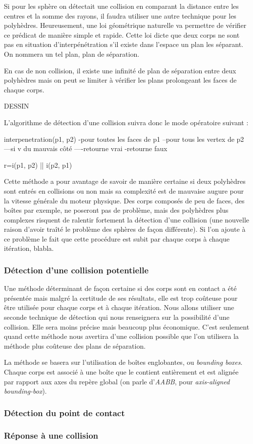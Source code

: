Si pour les sphère on détectait une collision en comparant la distance entre les centres et la somme des rayons, il faudra utiliser une autre technique pour les polyhèdres. Heureusement, une loi géométrique naturelle va permettre de vérifier ce prédicat de manière simple et rapide. Cette loi dicte que deux corps ne sont pas en situation d'interpénétration s'il existe dans l'espace un plan les séparant. On nommera un tel plan, plan de séparation.

En cas de non collision, il existe une infinité de plan de séparation entre deux polyhèdres mais on peut se limiter à vérifier les plans prolongeant les faces de chaque corps.

DESSIN

L'algorithme de détection d'une collision suivra donc le mode opératoire suivant :

interpenetration(p1, p2)
-pour toutes les faces de p1
--pour tous les vertex de p2
---si v du mauvais côté
----retourne vrai
-retourne faux

r=i(p1, p2) || i(p2, p1)

Cette méthode a pour avantage de savoir de manière certaine si deux polyhèdres sont entrés en collisions ou non mais sa complexité est de mauvaise augure pour la vitesse générale du moteur physique. Des corps composés de peu de faces, des boîtes par exemple, ne poseront pas de problème, mais des polyhèdres plus complexes risquent de ralentir fortement la détection d'une collision (une nouvelle raison d'avoir traîté le problème des sphères de façon différente). Si l'on ajoute à ce problème le fait que cette procédure est subit par chaque corps à chaque itération, blabla.

\subsubsection{Détection d'une collision potentielle}

Une méthode déterminant de façon certaine si des corps sont en contact a été présentée mais malgré la certitude de ses résultats, elle est trop coûteuse pour être utilisée pour chaque corps et à chaque itération. Nous allons utiliser une seconde technique de détection qui nous renseignera sur la possibilité d'une collision. Elle sera moins précise mais beaucoup plus économique. C'est seulement quand cette méthode nous avertira d'une collision possible que l'on utilisera la méthode plus coûteuse des plans de séparation.

La méthode se basera sur l'utilisation de boîtes englobantes, ou \textit{bounding boxes}. Chaque corps est associé à une boîte que le contient entièrement et est alignée par rapport aux axes du repère global (on parle d'\textit{AABB}, pour \textit{axis-aligned bounding-box}). 

\subsubsection{Détection du point de contact}

\subsubsection{Réponse à une collision}
